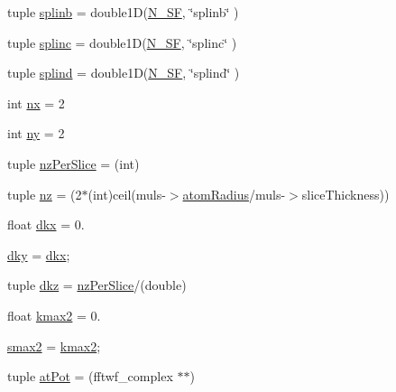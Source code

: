 \begin{DoxyCompactItemize}
\item 
tuple \hyperlink{namespacepython_1_1potential_ad24bd3f9256b68c806f91729b5424549}{splinb} = double1\-D(\hyperlink{scatfacts_rez_8hpp_a9b21bcdf5d732be9ec0a4101448116c9}{N\-\_\-\-S\-F}, \char`\"{}splinb\char`\"{} )
\item 
tuple \hyperlink{namespacepython_1_1potential_a7bc450096386b25a35acb14b766083d0}{splinc} = double1\-D(\hyperlink{scatfacts_rez_8hpp_a9b21bcdf5d732be9ec0a4101448116c9}{N\-\_\-\-S\-F}, \char`\"{}splinc\char`\"{} )
\item 
tuple \hyperlink{namespacepython_1_1potential_a9476e6e98237c222b8416108bae144ae}{splind} = double1\-D(\hyperlink{scatfacts_rez_8hpp_a9b21bcdf5d732be9ec0a4101448116c9}{N\-\_\-\-S\-F}, \char`\"{}splind\char`\"{} )
\item 
int \hyperlink{namespacepython_1_1potential_a45ef3ba885a8655a58532ce88f7a85b0}{nx} = 2
\item 
int \hyperlink{namespacepython_1_1potential_a35c4557193f9702081df5ac284fbcf3b}{ny} = 2
\item 
tuple \hyperlink{namespacepython_1_1potential_ac7c3e6e4deeb1cfa1e397a5fdb6c4049}{nz\-Per\-Slice} = (int)
\item 
tuple \hyperlink{namespacepython_1_1potential_aff640d78c41598ce018eaf70cc0af2e0}{nz} = (2$\ast$(int)ceil(muls-\/$>$\hyperlink{qstem_8m_a771570fcbf7eebdfa7d620704a8789a0}{atom\-Radius}/muls-\/$>$slice\-Thickness))
\item 
float \hyperlink{namespacepython_1_1potential_a1d2b0aac7f793fa41f05885ee0890f7f}{dkx} = 0.
\item 
\hyperlink{namespacepython_1_1potential_a2e7a9b5a9efe5c210899832341141003}{dky} = \hyperlink{namespacepython_1_1potential_a1d2b0aac7f793fa41f05885ee0890f7f}{dkx};
\item 
tuple \hyperlink{namespacepython_1_1potential_a09e49990bf7cc3d23dbdc26da239142e}{dkz} = \hyperlink{namespacepython_1_1potential_ac7c3e6e4deeb1cfa1e397a5fdb6c4049}{nz\-Per\-Slice}/(double)
\item 
float \hyperlink{namespacepython_1_1potential_a3d4c72ba4b75f9f8ea75a9055480d271}{kmax2} = 0.
\item 
\hyperlink{namespacepython_1_1potential_a5d356bc162350b5aa36a7de9864c654a}{smax2} = \hyperlink{namespacepython_1_1potential_a3d4c72ba4b75f9f8ea75a9055480d271}{kmax2};
\item 
tuple \hyperlink{namespacepython_1_1potential_a7cbd16891d7c557b696ed26450863b2a}{at\-Pot} = (fftwf\-\_\-complex $\ast$$\ast$)
$$
\end{DoxyCompactItemize}
